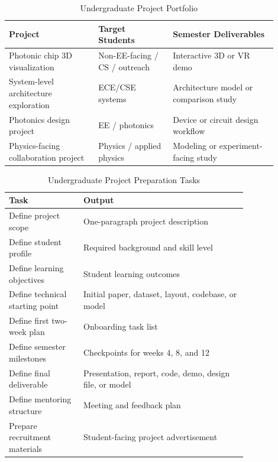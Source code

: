 \documentclass[custom, sidenote, final]{cls/oneproposal}
\begin{document}
\begin{table}[htbp]
    \centering
    \footnotesize
    \caption{Undergraduate Project Portfolio}\label{tab:ug-projects}
    \begin{tabular}{m{0.3\linewidth} p{0.25\linewidth} p{0.35\linewidth}}
        \toprule
        \textbf{Project}                      & \textbf{Target Students}      & \textbf{Semester Deliverables}         \\
        \midrule
        Photonic chip 3D visualization        & Non-EE-facing / CS / outreach & Interactive 3D or VR demo              \\
        \midrule
        System-level architecture exploration & ECE/CSE systems               & Architecture model or comparison study \\
        \midrule
        Photonics design project              & EE / photonics                & Device or circuit design workflow      \\
        \midrule
        Physics-facing collaboration project  & Physics / applied physics     & Modeling or experiment-facing study    \\
        \bottomrule
    \end{tabular}
\end{table}

\begin{table}[htbp]
    \centering
    \footnotesize
    \caption{Undergraduate Project Preparation Tasks}\label{tab:ug-project-tasks}
    \begin{tabular}{m{0.25\linewidth} p{0.55\linewidth}}
        \toprule
        \textbf{Task}                   & \textbf{Output}                                         \\
        \midrule
        Define project scope            & One-paragraph project description                       \\
        \midrule
        Define student profile          & Required background and skill level                     \\
        \midrule
        Define learning objectives      & Student learning outcomes                               \\
        \midrule
        Define technical starting point & Initial paper, dataset, layout, codebase, or model      \\
        \midrule
        Define first two-week plan      & Onboarding task list                                    \\
        \midrule
        Define semester milestones      & Checkpoints for weeks 4, 8, and 12                      \\
        \midrule
        Define final deliverable        & Presentation, report, code, demo, design file, or model \\
        \midrule
        Define mentoring structure      & Meeting and feedback plan                               \\
        \midrule
        Prepare recruitment materials   & Student-facing project advertisement                    \\
        \bottomrule
    \end{tabular}
\end{table}
\end{document}
